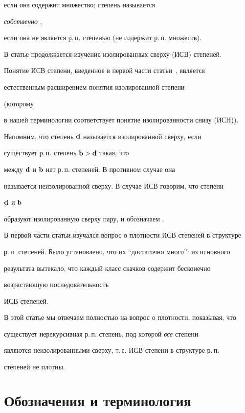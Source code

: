 если она содержит \re{} множество; \re{} степень называется


{\it собственно} \re, 


если она не является р.\,п. степенью (не содержит р.\,п. множеств).





В статье продолжается изучение изолированных сверху (ИСВ) \re{} степеней.


Понятие ИСВ степени, введенное в первой части статьи~\cite{Efr}, является


естественным расширением понятия изолированной \re{} степени~\cite{CoYi}


(которому


в нашей терминологии соответствует понятие изолированности снизу (ИСН)).


Напомним, что \re{} степень ${\bold d}$ называется изолированной сверху, если


существует р.\,п. степень ${\bold b}>{\bold d}$ такая, что


между ${\bold d}$ и ${\bold b}$ нет р.\,п. степеней. В противном случае она


называется неизолированной сверху. В случае ИСВ говорим, что степени


${\bold d}$ и ${\bold b}$


образуют изолированную сверху пару, и обозначаем .





В первой части статьи изучался вопрос о плотности ИСВ степеней в структуре


р.\,п. степеней. Было установлено, что их ``достаточно много'': из основного


результата вытекало, что каждый класс скачков содержит бесконечно


возрастающую последовательность


ИСВ \re степеней.


В этой статье мы отвечаем полностью на вопрос о плотности, показывая, что


существует нерекурсивная р.\,п. степень, под которой {\it все} \re{} степени


являются неизолированными сверху, т.\,е. ИСВ степени в структуре р.\,п.


степеней не плотны.





\section{Обозначения и терминология}





